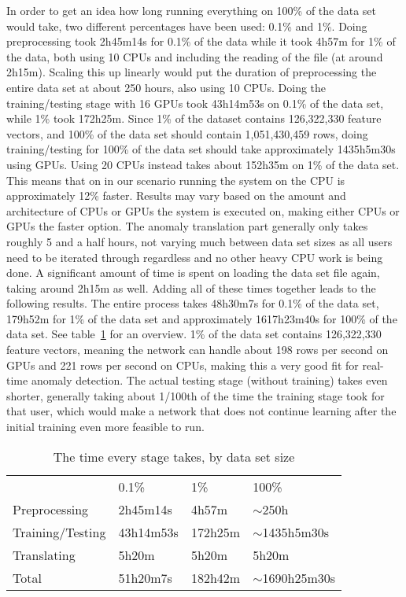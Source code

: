 In order to get an idea how long running everything on 100\% of the data set would take, two different percentages have been used: 0.1\% and 1\%. Doing preprocessing took 2h45m14s for 0.1\% of the data while it took 4h57m for 1\% of the data, both using 10 CPUs and including the reading of the file (at around 2h15m). Scaling this up linearly would put the duration of preprocessing the entire data set at about 250 hours, also using 10 CPUs. Doing the training/testing stage with 16 GPUs took 43h14m53s on 0.1\% of the data set, while 1\% took 172h25m. Since 1\% of the dataset contains 126,322,330 feature vectors, and 100\% of the data set should contain 1,051,430,459 rows, doing training/testing for 100\% of the data set should take approximately 1435h5m30s using GPUs. Using 20 CPUs instead takes about 152h35m on 1\% of the data set. This means that on in our scenario running the system on the CPU is approximately 12\% faster. Results may vary based on the amount and architecture of CPUs or GPUs the system is executed on, making either CPUs or GPUs the faster option. The anomaly translation part generally only takes roughly 5 and a half hours, not varying much between data set sizes as all users need to be iterated through regardless and no other heavy CPU work is being done. A significant amount of time is spent on loading the data set file again, taking around 2h15m as well. Adding all of these times together leads to the following results. The entire process takes 48h30m7s for 0.1\% of the data set, 179h52m for 1\% of the data set and approximately 1617h23m40s for 100\% of the data set. See table~\ref{tab:times_taken} for an overview. 1\% of the data set contains 126,322,330 feature vectors, meaning the network can handle about 198 rows per second on GPUs and 221 rows per second on CPUs, making this a very good fit for real-time anomaly detection. The actual testing stage (without training) takes even shorter, generally taking about 1/100th of the time the training stage took for that user, which would make a network that does not continue learning after the initial training even more feasible to run.

\begin{table}[]
	\centering
	\caption{The time every stage takes, by data set size}
	\label{tab:times_taken}
	\begin{tabular}{llll}
										  & 0.1\%     & 1\%     & 100\%             \\ \cline{2-4} 
	\multicolumn{1}{l|}{Preprocessing}    & 2h45m14s  & 4h57m   & \(\sim\)250h        \\
	\multicolumn{1}{l|}{Training/Testing} & 43h14m53s & 172h25m & \(\sim\)1435h5m30s \\
	\multicolumn{1}{l|}{Translating}      & 5h20m     & 5h20m   & 5h20m             \\
	\multicolumn{1}{l|}{Total}            & 51h20m7s  & 182h42m & \(\sim\)1690h25m30s
	\end{tabular}
\end{table}